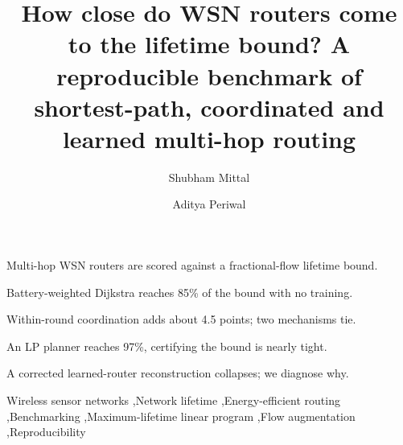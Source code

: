 \documentclass[preprint,12pt]{elsarticle}
\begin{document}
\begin{frontmatter}

\title{How close do WSN routers come to the lifetime bound? A reproducible benchmark of shortest-path, coordinated and learned multi-hop routing}

\author[inst1]{Shubham Mittal}
\author[inst1]{Aditya Periwal}

\begin{abstract}

\end{abstract}

\begin{highlights}
\item Multi-hop WSN routers are scored against a fractional-flow lifetime bound.
\item Battery-weighted Dijkstra reaches 85\% of the bound with no training.
\item Within-round coordination adds about 4.5 points; two mechanisms tie.
\item An LP planner reaches 97\%, certifying the bound is nearly tight.
\item A corrected learned-router reconstruction collapses; we diagnose why.
\end{highlights}

\begin{keyword}
Wireless sensor networks \sep Network lifetime \sep Energy-efficient routing \sep Benchmarking \sep Maximum-lifetime linear program \sep Flow augmentation \sep Reproducibility
\end{keyword}

\end{frontmatter}









\providecommand{\appendices}{\appendix}





\end{document}
